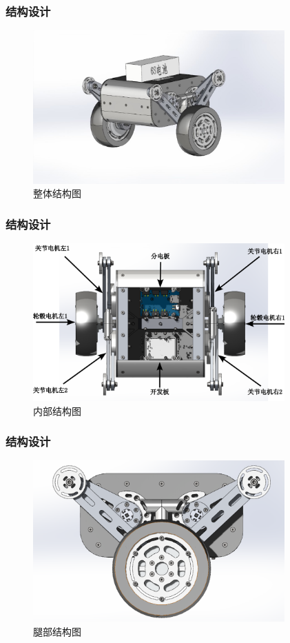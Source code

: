 \documentclass{beamer}
\begin{document}
	\begin{frame}
	\frametitle{结构设计}
			\begin{figure}          
			\centering              
			\includegraphics[width=3.8in]{img/chapter2/6}  
			\captionsetup{font=scriptsize} 
			\caption{整体结构图} 
		\end{figure}  
	\end{frame}	
	
		\begin{frame}
		\frametitle{结构设计}
		\begin{figure}          
			\centering              
			\includegraphics[width=3.8in]{img/chapter2/7.pdf}  
			\captionsetup{font=scriptsize} 
			\caption{内部结构图} 
		\end{figure}  
	\end{frame}	
	
			\begin{frame}
		\frametitle{结构设计}
		\begin{figure}          
			\centering              
			\includegraphics[width=3.8in]{img/chapter2/8}  
			\captionsetup{font=scriptsize} 
			\caption{腿部结构图} 
		\end{figure}  
	\end{frame}	
	
\end{document}
